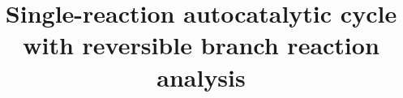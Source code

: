 \documentclass[a4page,notitlepage]{article}
\begin{document}

\title{Single-reaction autocatalytic cycle with reversible branch reaction analysis}

\end{document}

